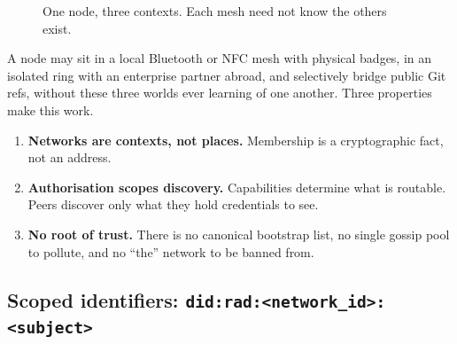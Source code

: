 \documentclass[a4paper,11pt,twoside,parskip=half-,headings=small]{scrartcl}
\begin{document}
\begin{figure}[H]
\centering
{}
\caption{One node, three contexts. Each mesh need not know the others exist.}
\label{fig:dualhomed}
\end{figure}

A node may sit in a local Bluetooth or NFC mesh with physical badges, in an isolated ring
with an enterprise partner abroad, and selectively bridge public Git refs, without these three worlds
ever learning of one another. Three properties make this work.

\begin{enumerate}
  \item \textbf{Networks are contexts, not places.} Membership is a cryptographic fact, not an address.
  \item \textbf{Authorisation scopes discovery.} Capabilities determine what is routable. Peers
        discover only what they hold credentials to see.
  \item \textbf{No root of trust.} There is no canonical bootstrap list, no single gossip pool to
        pollute, and no ``the'' network to be banned from.
\end{enumerate}

\subsection{Scoped identifiers: \texttt{did:rad:<network\_id>:<subject>}}
\label{sec:scoped_did}
\end{document}
